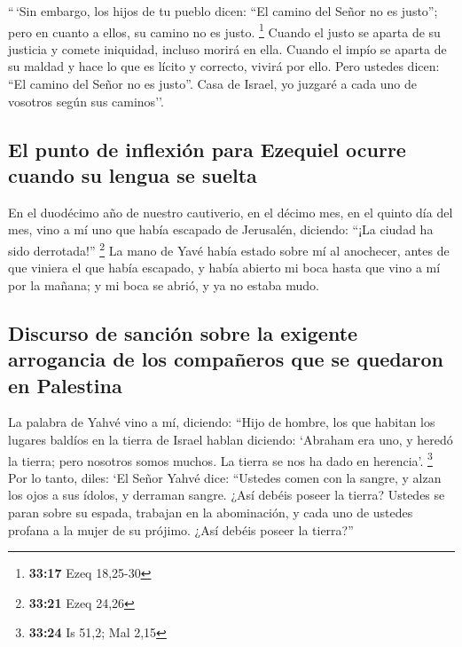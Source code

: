 \begin{paracol}{2}
 ``\,`Sin embargo, los hijos de tu pueblo dicen: ``El
camino del Señor no es justo''; pero en cuanto a ellos, su camino no es
justo. \footnote{\textbf{33:17} Ezeq 18,25-30}  Cuando el
justo se aparta de su justicia y comete iniquidad, incluso morirá en
ella.  Cuando el impío se aparta de su maldad y hace lo
que es lícito y correcto, vivirá por ello.  Pero ustedes
dicen: ``El camino del Señor no es justo''. Casa de Israel, yo juzgaré a
cada uno de vosotros según sus caminos''.

\hypertarget{el-punto-de-inflexiuxf3n-para-ezequiel-ocurre-cuando-su-lengua-se-suelta}{%
\subsection{El punto de inflexión para Ezequiel ocurre cuando su lengua
se
suelta}\label{el-punto-de-inflexiuxf3n-para-ezequiel-ocurre-cuando-su-lengua-se-suelta}}

 En el duodécimo año de nuestro cautiverio, en el décimo
mes, en el quinto día del mes, vino a mí uno que había escapado de
Jerusalén, diciendo: ``¡La ciudad ha sido derrotada!'' \footnote{\textbf{33:21}
  Ezeq 24,26}  La mano de Yavé había estado sobre mí al
anochecer, antes de que viniera el que había escapado, y había abierto
mi boca hasta que vino a mí por la mañana; y mi boca se abrió, y ya no
estaba mudo.

\hypertarget{discurso-de-sanciuxf3n-sobre-la-exigente-arrogancia-de-los-compauxf1eros-que-se-quedaron-en-palestina}{%
\subsection{Discurso de sanción sobre la exigente arrogancia de los
compañeros que se quedaron en
Palestina}\label{discurso-de-sanciuxf3n-sobre-la-exigente-arrogancia-de-los-compauxf1eros-que-se-quedaron-en-palestina}}

 La palabra de Yahvé vino a mí, diciendo: 
``Hijo de hombre, los que habitan los lugares baldíos en la tierra de
Israel hablan diciendo: `Abraham era uno, y heredó la tierra; pero
nosotros somos muchos. La tierra se nos ha dado en herencia'.
\footnote{\textbf{33:24} Is 51,2; Mal 2,15}  Por lo
tanto, diles: `El Señor Yahvé dice: ``Ustedes comen con la sangre, y
alzan los ojos a sus ídolos, y derraman sangre. ¿Así debéis poseer la
tierra?  Ustedes se paran sobre su espada, trabajan en la
abominación, y cada uno de ustedes profana a la mujer de su prójimo.
¿Así debéis poseer la tierra?''


\end{paracol}

